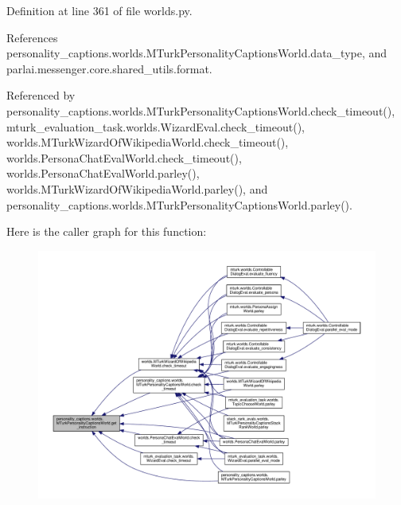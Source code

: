 Definition at line 361 of file worlds.\+py.



References personality\+\_\+captions.\+worlds.\+M\+Turk\+Personality\+Captions\+World.\+data\+\_\+type, and parlai.\+messenger.\+core.\+shared\+\_\+utils.\+format.



Referenced by personality\+\_\+captions.\+worlds.\+M\+Turk\+Personality\+Captions\+World.\+check\+\_\+timeout(), mturk\+\_\+evaluation\+\_\+task.\+worlds.\+Wizard\+Eval.\+check\+\_\+timeout(), worlds.\+M\+Turk\+Wizard\+Of\+Wikipedia\+World.\+check\+\_\+timeout(), worlds.\+Persona\+Chat\+Eval\+World.\+check\+\_\+timeout(), worlds.\+Persona\+Chat\+Eval\+World.\+parley(), worlds.\+M\+Turk\+Wizard\+Of\+Wikipedia\+World.\+parley(), and personality\+\_\+captions.\+worlds.\+M\+Turk\+Personality\+Captions\+World.\+parley().

Here is the caller graph for this function\+:
\nopagebreak
\begin{figure}[H]
\begin{center}
\leavevmode
\includegraphics[width=350pt]{classpersonality__captions_1_1worlds_1_1MTurkPersonalityCaptionsWorld_a4e9a57d65cc93af5741f56597a970618_icgraph}
\end{center}
\end{figure}
\mbox{\label{classpersonality__captions_1_1worlds_1_1MTurkPersonalityCaptionsWorld_ab682688b0f65bc5162cb77f3d96fafc4}} 
